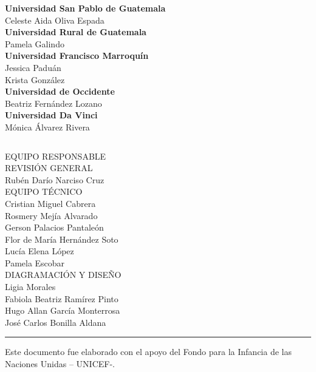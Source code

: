 \begin{multicols}{2}
\begin{center}
	\textbf{Universidad San Pablo de Guatemala}\\
	Celeste Aida Oliva Espada\\ [0.4cm]
	
	\textbf{Universidad Rural de Guatemala}\\
	Pamela Galindo\\ [0.4cm]
	
	\textbf{Universidad Francisco Marroquín}\\
	Jessica Paduán\\
	Krista González\\ [0.4cm]
	
	\textbf{Universidad de Occidente}\\
	Beatriz Fernández Lozano\\ [0.4cm]
	
	\textbf{Universidad Da Vinci}\\
	Mónica Álvarez Rivera\\[0.8cm]
	
	
\end{center}

\end{multicols}
\setcounter{page}{0}\cleardoublepage
\clearpage

$\ $
\vspace{1cm}

\begin{center}
	{\Bold \LARGE EQUIPO RESPONSABLE}\\[2cm]
	
	{\Bold \large \color{color1!89!black} REVISIÓN GENERAL}\\[0.2cm]
	Rubén Darío Narciso Cruz\\[0.8cm]
	
	
	{\Bold \large \color{color1!89!black} EQUIPO TÉCNICO}\\[0.2cm]
	Cristian Miguel Cabrera\\
	Rosmery Mejía Alvarado\\
	Gerson Palacios Pantaleón\\
	Flor de María Hernández Soto\\
	Lucía Elena López\\
	Pamela Escobar\\[0.8cm]
	
{\Bold \large \color{color1!89!black} DIAGRAMACIÓN Y DISEÑO}\\[0.2cm]
Ligia Morales\\
Fabiola Beatriz Ramírez Pinto\\
Hugo Allan García Monterrosa\\
José Carlos Bonilla Aldana\\[8cm]

\hrule
	Este documento fue elaborado con el apoyo del Fondo para la Infancia de las Naciones Unidas – UNICEF-.\\[0.8cm]


\end{center}\setcounter{page}{0}\cleardoublepage


